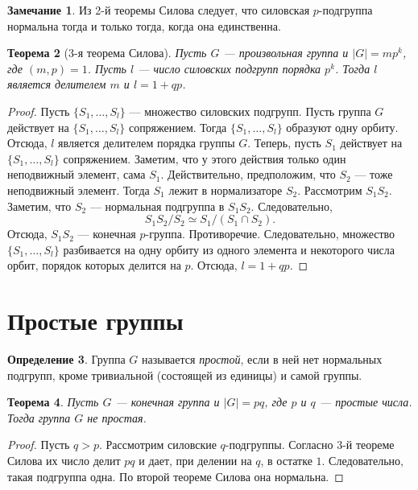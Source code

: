 \documentclass[12pt, titlepage, oneside]{amsbook}
\newtheorem{theorem}{Теорема}[chapter]
\theoremstyle{definition}
\newtheorem{definition}[theorem]{Определение}
\newtheorem{remark}[theorem]{Замечание}
\theoremstyle{remark}
\begin{document}
\begin{remark}
Из 2-й теоремы Силова следует, что силовская $p$-подгруппа нормальна тогда и только тогда, когда она единственна.
\end{remark}

\begin{theorem}[3-я теорема Силова]
\label{3Sil} Пусть $G$ --- произвольная группа и $|G|=mp^k$, где
$(m,p)=1$. Пусть $l$ --- число силовских подгрупп порядка $p^k$.
Тогда $l$ является делителем $m$ и $l=1+qp$.
\end{theorem}

\begin{proof}
Пусть $\{S_1,\dots,S_l\}$ --- множество силовских подгрупп. Пусть
группа $G$ действует на $\{S_1,\dots,S_l\}$ сопряжением. Тогда
$\{S_1,\dots,S_l\}$ образуют одну орбиту. Отсюда, $l$ является
делителем порядка группы $G$. Теперь, пусть $S_1$ действует на
$\{S_1,\dots,S_l\}$ сопряжением. Заметим, что у этого действия только один неподвижный элемент, сама $S_1$. Действительно, предположим, что $S_2$ --- тоже неподвижный элемент. Тогда $S_1$ лежит в нормализаторе $S_2$. Рассмотрим $S_1S_2$. Заметим, что $S_2$ --- нормальная подгруппа в $S_1S_2$. Следовательно, $$S_1S_2/S_2\simeq S_1/(S_1\cap S_2).$$ Отсюда, $S_1S_2$ --- конечная $p$-группа. Противоречие. Следовательно, множество $\{S_1,\dots,S_l\}$
разбивается на одну орбиту из одного элемента и некоторого числа
орбит, порядок которых делится на $p$. Отсюда, $l=1+qp$.
\end{proof}

\section{Простые группы}

\begin{definition}
Группа $G$ называется \emph{простой}, если в ней нет нормальных подгрупп, кроме тривиальной (состоящей из единицы) и самой группы.
\end{definition}

\begin{theorem}
\label{Pr1} Пусть $G$ --- конечная группа и $|G|=pq$, где
$p$ и $q$ --- простые числа. Тогда группа $G$ не простая.
\end{theorem}

\begin{proof}
Пусть $q>p$. Рассмотрим силовские $q$-подгруппы. Согласно 3-й теореме Силова их число делит $pq$ и дает, при делении на $q$, в остатке $1$. Следовательно, такая подгруппа одна. По второй теореме Силова она нормальна.
\end{proof}
\end{document}
